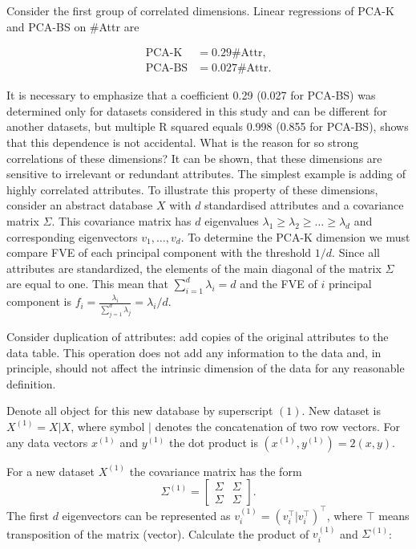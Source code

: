 \documentclass[entropy,article,submit,moreauthors,pdftex]{Definitions/mdpi}
\begin{document}
Consider the first group of correlated dimensions. Linear regressions of PCA-K and PCA-BS on \#Attr are

\begin{equation*}\label{eq.LinRegK}
\begin{split}
\text{PCA-K} &= 0.29 \text{\#Attr},\\
\text{PCA-BS} &= 0.027 \text{\#Attr}.
\end{split}
\end{equation*}

It is necessary to emphasize that a coefficient 0.29 (0.027 for PCA-BS) was determined only for datasets considered in this study and can be different for another datasets, but multiple R squared equals 0.998 (0.855 for PCA-BS), shows that this dependence is not accidental. What is the reason for so strong correlations of these dimensions? It can be shown, that these dimensions are sensitive to irrelevant or redundant attributes. The simplest example is adding of highly correlated attributes. To illustrate this property of these dimensions, consider an abstract database $X$ with $d$ standardised attributes and a covariance matrix $\Sigma$. This covariance matrix has $d$ eigenvalues $\lambda_1\ge\lambda_2\ge\ldots\ge\lambda_d$ and corresponding eigenvectors $v_1,\ldots,v_d$. To determine the PCA-K dimension we must compare FVE of each principal component with the threshold $1/d$. Since all attributes are standardized, the elements of the main diagonal of the matrix $\Sigma$ are equal to one. This mean that $\sum_{i=1}^{d}\lambda_i=d$ and the FVE of $i$ principal component is $f_i=\frac{\lambda_i}{\sum_{j=1}^{d}\lambda_j}=\lambda_i/d$.

Consider duplication of attributes: add copies of the original attributes to the data table. This operation does not add any information to the data and, in principle, should not affect the intrinsic dimension of the data for any reasonable definition.

Denote all object for this new database by superscript $(1)$. New dataset is $X^{(1)}=X|X$, where symbol $|$ denotes the concatenation of two row vectors. For any data vectors $x^{(1)}$ and $y^{(1)}$ the dot product is $(x^{(1)}, y^{(1)})=2(x, y)$.

For a new dataset $X^{(1)}$ the covariance matrix has the form
\begin{equation*}\label{eq.Covar}
\Sigma ^{(1)}= \begin{bmatrix}
\Sigma & \Sigma\\
\Sigma & \Sigma
\end{bmatrix}.
\end{equation*}
The first $d$ eigenvectors can be represented as $v^{(1)}_i=(v_i^\intercal |v_i^\intercal)^\intercal$, where $\intercal$ means transposition of the matrix (vector). Calculate the product of $v^{(1)}_i$ and $\Sigma ^{(1)}$:
\end{document}

